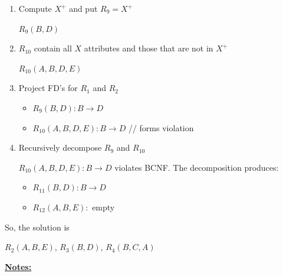 \documentclass[12pt]{article}
\begin{document}
\begin{enumerate}[1.]
\begin{enumerate}[a)]
\begin{itemize}
\begin{enumerate}[1.]
                \item Compute $X^+$ and put $R_9 = X^+$

                \color{red}
                $R_9(B,D)$
                \color{black}

                \item $R_{10}$ contain all $X$ attributes and those that are not in $X^+$

                \color{red}
                $R_{10}(A,B,D,E)$
                \color{black}

                \item Project FD's for $R_1$ and $R_2$

                \bigskip

                \color{red}
                \begin{itemize}
                    \item $R_9(B,D): B \to D$
                    \item $R_{10}(A,B,D,E): B \to D$ // \color{red}forms violation\color{black}
                \end{itemize}
                \color{black}
                \item Recursively decompose $R_9$ and $R_10$

                \bigskip

                $R_{10}(A,B,D,E): B \to D$ violates BCNF. The decomposition produces:
                \bigskip

                \begin{itemize}
                    \item $R_{11}(B,D): B \to D$
                    \item $R_{12}(A,B,E):$ \color{red}empty\color{black}
                \end{itemize}


            \end{enumerate}

        \end{itemize}

        \bigskip

        So, the solution is

        \bigskip

        $R_2(A,B,E)$, $R_3(B,D)$, $R_4(B,C,A)$


    \end{enumerate}

    \bigskip

    \underline{\textbf{Notes:}}


\end{enumerate}
\end{document}
